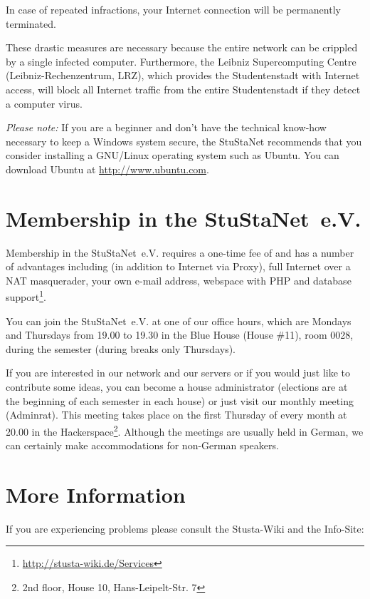 \documentclass[a4paper,12pt]{scrartcl}
\begin{document}
\begin{em}
In case of repeated infractions, your Internet connection will be permanently terminated.
\end{em}

These drastic measures are necessary because the entire network can be crippled by a single infected computer. Furthermore, the Leibniz Supercomputing Centre (Leibniz-Rechenzentrum, LRZ), which provides the Studentenstadt with Internet access, will block all Internet traffic from the entire Studentenstadt if they detect a computer virus.

\emph{Please note:} If you are a beginner and don't have the technical know-how necessary to keep a Windows system secure, the StuStaNet recommends that you consider installing a GNU/Linux operating system such as Ubuntu. You can download Ubuntu at \url{http://www.ubuntu.com}.


\section*{Membership in the StuStaNet~e.V.}

Membership in the StuStaNet~e.V. requires a one-time fee of  and has a number of advantages including (in addition to Internet via Proxy), full Internet over a NAT masquerader, your own e-mail address, webspace with PHP and database support\footnote{\url{http://stusta-wiki.de/Services}}.

You can join the StuStaNet~e.V. at one of our office hours, which are Mondays and Thursdays from 19.00 to 19.30 in the Blue House (House \#11), room 0028, during the semester (during breaks only Thursdays).

If you are interested in our network and our servers or if you would just like to contribute some ideas, you can become a house administrator (elections are at the beginning of each semester in each house) or just visit our monthly meeting (Adminrat). This meeting takes place on the first Thursday of every month at 20.00 in the Hackerspace\footnote{2nd floor, House 10, Hans-Leipelt-Str. 7}. Although the meetings are usually held in German, we can certainly make accommodations for non-German speakers.

\section*{More Information}

If you are experiencing problems please consult the Stusta-Wiki and the Info-Site:
\end{document}
